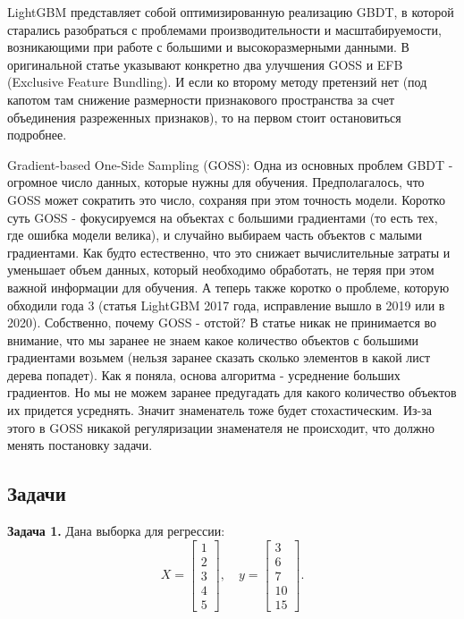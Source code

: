 LightGBM представляет собой оптимизированную реализацию GBDT, в которой старались разобраться с проблемами производительности и масштабируемости, возникающими при работе с большими и высокоразмерными данными. В оригинальной статье указывают конкретно два улучшения GOSS и EFB (Exclusive Feature Bundling). И если ко второму методу претензий нет (под капотом там снижение размерности признакового пространства за счет объединения разреженных признаков), то на первом стоит остановиться подробнее.

Gradient-based One-Side Sampling (GOSS):
Одна из основных проблем GBDT - огромное число данных, которые нужны для обучения. Предполагалось, что GOSS может сократить это число, сохраняя при этом точность модели. Коротко суть GOSS - фокусируемся на объектах с большими градиентами (то есть тех, где ошибка модели велика), и случайно выбираем часть объектов с малыми градиентами. Как будто естественно, что это снижает вычислительные затраты и уменьшает объем данных, который необходимо обработать, не теряя при этом важной информации для обучения. А теперь также коротко о проблеме, которую обходили года 3 (статья LightGBM 2017 года, исправление вышло в 2019 или в 2020). Собственно, почему GOSS - отстой? В статье никак не принимается во внимание, что мы заранее не знаем какое количество объектов с большими градиентами возьмем (нельзя заранее сказать сколько элементов в какой лист дерева попадет). Как я поняла, основа алгоритма - усреднение больших градиентов. Но мы не можем заранее предугадать для какого количество объектов их придется усреднять. Значит знаменатель тоже будет стохастическим. Из-за этого в GOSS никакой регуляризации знаменателя не происходит, что должно менять постановку задачи.

\subsection*{Задачи}

\textbf{Задача 1.}  
Дана выборка для регрессии:  
\[
X = \begin{bmatrix} 1 \\ 2 \\ 3 \\ 4 \\ 5 \end{bmatrix}, \quad y = \begin{bmatrix} 3 \\ 6 \\ 7 \\ 10 \\ 15 \end{bmatrix}.
\]


